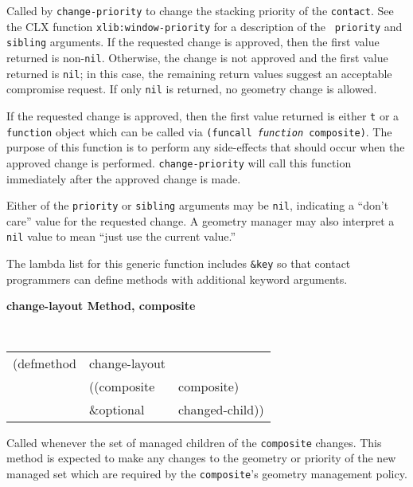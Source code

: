 \documentclass[twoside]{book}
\begin{document}
\begin{sloppy}
{\begin{flushright}
{}\end{flushright}}

\begin{flushright} \parbox[t]{6.125in}{
Called by {\tt change-priority}
to change the stacking priority of the {\tt contact}.
See the CLX function {\tt xlib:window-priority} for a description of the {\tt
priority} and {\tt sibling} arguments.
If the
requested change is approved, then the first value returned
is non-{\tt nil}. Otherwise, the change is not approved and the first  value returned is
{\tt nil}; in this case, the remaining return values suggest an acceptable
compromise request.
If only {\tt nil} is returned, no geometry change is allowed.

\parbox[t]{6.125in}{ If the requested change is approved, then the first value
returned is either {\tt t} or a {\tt function} object which can be called via
{\tt (funcall {\em function} composite)}. The purpose of this function is to
perform any side-effects that should occur when the approved change is
performed. {\tt change-priority} will call this function immediately after the
approved change is made.}

Either of the {\tt priority} or {\tt sibling} 
arguments may be {\tt nil}, indicating a ``don't care'' value for the requested
change. A geometry manager may also interpret a {\tt nil} value to mean ``just
use the current value.''


The lambda list for this generic function includes {\tt \&key} so that contact
programmers can define methods with additional keyword arguments.
}\end{flushright}

{\samepage
{\large {\bf change-layout \hfill Method, composite}}
\begin{flushright} \parbox[t]{6.125in}{
\tt
\begin{tabular}{lll}
\raggedright
(defmethod & change-layout & \\
& ((composite  &composite) \\
&  \&optional & changed-child))
\end{tabular}
\rm

}\end{flushright}}

\begin{flushright} \parbox[t]{6.125in}{
Called whenever the set of managed children of the {\tt composite} changes. This
method is expected to make any changes to the geometry or priority of the new
managed set which are required by the {\tt composite}'s geometry management
policy. 

}
\end{flushright}
\end{sloppy}
\end{document}
